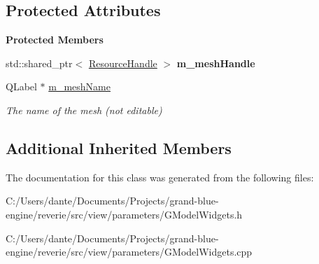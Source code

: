 \subsection*{Protected Attributes}
\begin{Indent}\textbf{ Protected Members}\par
\begin{DoxyCompactItemize}
\item 
\mbox{\label{classrev_1_1_view_1_1_mesh_resource_widget_a34395ecb9034b9775399cd67b91fd2c6}} 
std\+::shared\+\_\+ptr$<$ \mbox{\hyperlink{classrev_1_1_resource_handle}{Resource\+Handle}} $>$ {\bfseries m\+\_\+mesh\+Handle}
\item 
\mbox{\label{classrev_1_1_view_1_1_mesh_resource_widget_ae5b54e77a66e7c824c4cf39237824442}} 
Q\+Label $\ast$ \mbox{\hyperlink{classrev_1_1_view_1_1_mesh_resource_widget_ae5b54e77a66e7c824c4cf39237824442}{m\+\_\+mesh\+Name}}
\begin{DoxyCompactList}\small\item\em The name of the mesh (not editable) \end{DoxyCompactList}\end{DoxyCompactItemize}
\end{Indent}
\subsection*{Additional Inherited Members}


The documentation for this class was generated from the following files\+:\begin{DoxyCompactItemize}
\item 
C\+:/\+Users/dante/\+Documents/\+Projects/grand-\/blue-\/engine/reverie/src/view/parameters/G\+Model\+Widgets.\+h\item 
C\+:/\+Users/dante/\+Documents/\+Projects/grand-\/blue-\/engine/reverie/src/view/parameters/G\+Model\+Widgets.\+cpp\end{DoxyCompactItemize}
